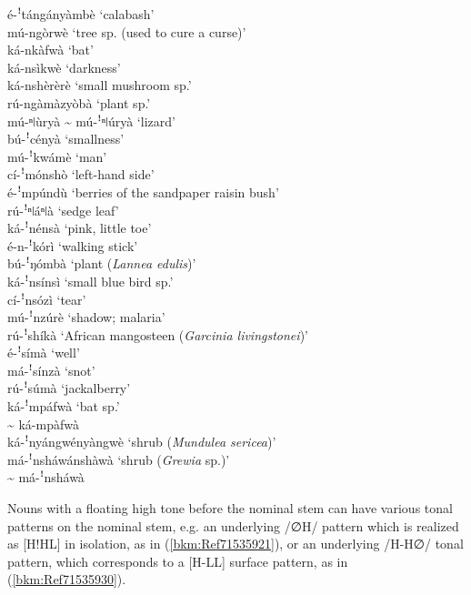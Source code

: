 \ea
\label{bkm:Ref489982300}
é-ꜝtángányàmbè  \tab    ‘calabash’\\
mú-ngòrwè   \tab     ‘tree sp. (used to cure a curse)’\\
ká-nkàfwà     \tab   ‘bat’\\
ká-nsìkwè  \tab      ‘darkness’\\
ká-nshèrèrè    \tab     ‘small mushroom sp.’\\
rú-ngàmàzyòbà   \tab   ‘plant sp.’\\
mú-ⁿǀùryà {\textasciitilde} mú-ꜝⁿǀúryà   \tab ‘lizard’  \\
bú-ꜝcényà   \tab     ‘smallness’\\
mú-ꜝkwámè       \tab ‘man’\\
cí-ꜝmónshò \tab       ‘left-hand side’\\
é-ꜝmpúndù      \tab  ‘berries of the sandpaper raisin bush’\\
rú-ꜝⁿǀáⁿǀà \tab       ‘sedge leaf’\\
ká-ꜝnénsà      \tab  ‘pink, little toe’\\
é-n-ꜝkórì \tab       ‘walking stick’\\
bú-ꜝŋómbà  \tab      ‘plant (\textit{Lannea edulis})’\\
ká-ꜝnsínsì     \tab   ‘small blue bird sp.’\\
cí-ꜝnsózì   \tab     ‘tear’\\
mú-ꜝnzúrè    \tab    ‘shadow; malaria’\\
rú-ꜝshíkà     \tab   ‘African mangosteen (\textit{Garcinia livingstonei})’\\
é-ꜝsímà    \tab    ‘well’\\
má-ꜝsínzà   \tab     ‘snot’\\
rú-ꜝsúmà     \tab   ‘jackalberry’\\
ká-ꜝmpáfwà   \tab  ‘bat sp.’\\
{\textasciitilde} ká-mpàfwà\\
ká-ꜝnyángwényàngwè  \tab  ‘shrub (\textit{Mundulea sericea})’\\
má-ꜝnsháwánshàwà  \tab ‘shrub (\textit{Grewia} sp.)’\\
{\textasciitilde} má-ꜝnsháwà
\z\pagebreak

Nouns with a floating high tone before the nominal stem can have various tonal patterns on the nominal stem, e.g. an underlying /∅H/ pattern which is realized as [H!HL] in isolation, as in (\ref{bkm:Ref71535921}), or an underlying /H-H∅/ tonal pattern, which corresponds to a [H-LL] surface pattern, as in (\ref{bkm:Ref71535930}).

